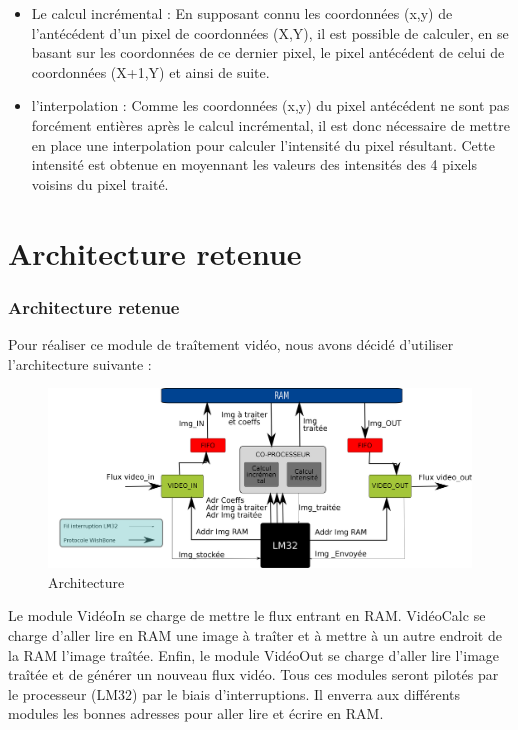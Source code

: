 {	\begin{itemize}
\item Le calcul incrémental : En supposant connu les coordonnées (x,y) de l'antécédent d'un pixel de coordonnées (X,Y), il est possible de calculer, en se basant sur les coordonnées de ce dernier pixel, le pixel antécédent de celui de coordonnées (X+1,Y) et ainsi de suite. 
\item l'interpolation : Comme les coordonnées (x,y) du pixel antécédent ne sont pas forcément entières après le calcul incrémental, il est donc nécessaire de mettre en place une interpolation pour calculer l'intensité du pixel résultant. Cette intensité est obtenue en moyennant les valeurs des intensités des 4 pixels voisins du pixel traité. 
\end{itemize}

	\part*{Architecture retenue}
	\section{Architecture retenue}
{Pour réaliser ce module de traîtement vidéo, nous avons décidé d'utiliser l'architecture suivante :
 
\begin{figure}[!h]
	\centering
	\includegraphics[scale = 0.1]{hardware-arch.png}
	\caption{Architecture}
\end{figure}

Le module VidéoIn se charge de mettre le flux entrant en RAM. VidéoCalc se charge d'aller lire en RAM une image à traîter et à mettre à un autre endroit de la RAM l'image traîtée. Enfin, le module VidéoOut se charge d'aller lire l'image traîtée et de générer un nouveau flux vidéo. Tous ces modules seront pilotés par le processeur (LM32) par le biais d'interruptions. Il enverra aux différents modules les bonnes adresses pour aller lire et écrire en RAM.


}}
